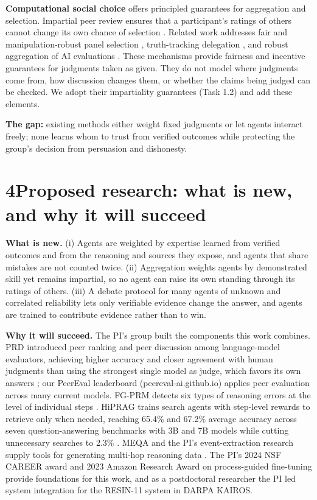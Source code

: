 \documentclass[11pt,letterpaper]{article}
\begin{document}
\textbf{Computational social choice} offers principled guarantees for aggregation and selection. Impartial peer review ensures that a participant's ratings of others cannot change its own chance of selection \cite{kurokawa2015impartial,alon2011sum}. Related work addresses fair and manipulation-robust panel selection \cite{flanigan2021fair,flanigan2024manipulation}, truth-tracking delegation \cite{berinsky2025liquid}, and robust aggregation of AI evaluations \cite{khalaf2026maximal}. These mechanisms provide fairness and incentive guarantees for judgments taken as given. They do not model where judgments come from, how discussion changes them, or whether the claims being judged can be checked. We adopt their impartiality guarantees (Task 1.2) and add these elements.

\textbf{The gap:} existing methods either weight fixed judgments or let agents interact freely; none learns whom to trust from verified outcomes while protecting the group's decision from persuasion and dishonesty.

\section*{4\quad Proposed research: what is new, and why it will succeed}
\textbf{What is new.} (i) Agents are weighted by expertise learned from verified outcomes and from the reasoning and sources they expose, and agents that share mistakes are not counted twice. (ii) Aggregation weights agents by demonstrated skill yet remains impartial, so no agent can raise its own standing through its ratings of others. (iii) A debate protocol for many agents of unknown and correlated reliability lets only verifiable evidence change the answer, and agents are trained to contribute evidence rather than to win.

\textbf{Why it will succeed.} The PI's group built the components this work combines. PRD introduced peer ranking and peer discussion among language-model evaluators, achieving higher accuracy and closer agreement with human judgments than using the strongest single model as judge, which favors its own answers \cite{li2024prd}; our PeerEval leaderboard (peereval-ai.github.io) applies peer evaluation across many current models. FG-PRM detects six types of reasoning errors at the level of individual steps \cite{li2025fgprm}. HiPRAG trains search agents with step-level rewards to retrieve only when needed, reaching 65.4\% and 67.2\% average accuracy across seven question-answering benchmarks with 3B and 7B models while cutting unnecessary searches to 2.3\% \cite{wu2026hiprag}. MEQA and the PI's event-extraction research supply tools for generating multi-hop reasoning data \cite{li2024meqa}. The PI's 2024 NSF CAREER award and 2023 Amazon Research Award on process-guided fine-tuning provide foundations for this work, and as a postdoctoral researcher the PI led system integration for the RESIN-11 system in DARPA KAIROS.
\end{document}
